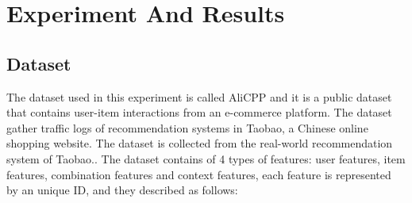 \chapter{Experiment And Results}
\minitoc

\section{Dataset}

The dataset used in this experiment is called AliCPP and it is a public dataset that contains user-item interactions from an e-commerce platform. The dataset gather traffic logs of recommendation systems in Taobao, a Chinese online shopping website. The dataset is collected from the real-world recommendation system of Taobao.\cite{AliCPP}. The dataset contains of 4 types of features: user features, item features, combination features and context features, each feature is represented by an unique ID, and they described as follows:

